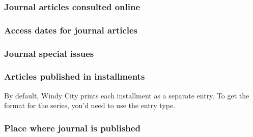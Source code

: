 \documentclass[11pt,letterpaper,oneside]{article}
\begin{document}
\subsubsection{Journal articles consulted online}

\begin{citebib}
\item \cite[268]{whitney1929}
\item \cite[260--61]{schoenfield2016}
\end{citebib}

\subsubsection{Access dates for journal articles}

\begin{citebib}
\item \cite[81]{narr2015}
\item \cite[88--89]{narr2015}
\end{citebib}

\setcounter{subsubsection}{177}
\subsubsection{Journal special issues}

\begin{citebib}
\item \cite{tezuka2013}
\end{citebib}

\setcounter{subsubsection}{179}
\subsubsection{Articles published in installments}

By default, Windy City prints each installment as a separate entry. To
get the format for the series, you'd need to use the 
entry type.

\begin{citebib}
\item \cite[312]{brown1978}
\end{citebib}

\setcounter{subsubsection}{181}
\subsubsection{Place where journal is published}
\end{document}
